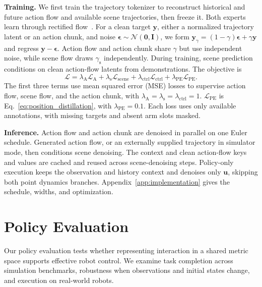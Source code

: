 \noindent\textbf{Training.}
We first train the trajectory tokenizer to reconstruct historical and
future action flow and available scene trajectories, then freeze it.
Both experts learn through rectified flow~\citep{liu2022rectifiedflow}.
For a clean target $\mathbf y$, either a normalized trajectory latent or
an action chunk, and noise
$\boldsymbol\epsilon\sim\mathcal N(\mathbf 0,\mathbf I)$, we form
$\mathbf y_\gamma=(1-\gamma)\boldsymbol\epsilon+\gamma\mathbf y$ and
regress $\mathbf y-\boldsymbol\epsilon$.
Action flow and action chunk share $\gamma$ but use independent noise, while scene
flow draws $\gamma_{\mathrm s}$ independently.
During training, scene prediction conditions on clean action-flow latents
from demonstrations. The objective is
\begin{equation}
    \mathcal L
    =\lambda_{\mathrm A}\mathcal L_{\mathrm A}
    +\lambda_{\mathrm s}\mathcal L_{\mathrm{scene}}
    +\lambda_{\mathrm{ctrl}}\mathcal L_{\mathrm{ctrl}}
    +\lambda_{\mathrm{PE}}\mathcal L_{\mathrm{PE}}.
    \label{eq:training_objective}
\end{equation}
The first three terms use mean squared error (MSE) losses to supervise
action flow, scene flow, and the action chunk, with
$\lambda_{\mathrm A}=\lambda_{\mathrm s}=\lambda_{\mathrm{ctrl}}=1$.
$\mathcal L_{\mathrm{PE}}$ is Eq.~\ref{eq:position_distillation}, with
$\lambda_{\mathrm{PE}}=0.1$.
Each loss uses only available annotations, with missing targets and
absent arm slots masked.

\noindent\textbf{Inference.}
Action flow and action chunk are denoised in parallel on one Euler schedule.
Generated action flow, or an externally supplied trajectory in simulator
mode, then conditions scene denoising.
The context and clean action-flow keys and values are cached and reused
across scene-denoising steps.
Policy-only execution keeps the observation and history context and
denoises only $\mathbf u$, skipping both point dynamics branches.
Appendix~\ref{app:implementation} gives the schedule, widths, and
optimization.

\vspace{-0.3cm}

\section{Policy Evaluation}
\label{sec:experiments}
\label{sec:experiments:policy}
\vspace{-0.2cm}

Our policy evaluation tests whether representing interaction in a shared
metric space supports effective robot control. We examine task completion
across simulation benchmarks, robustness when observations and initial
states change, and execution on real-world robots.


